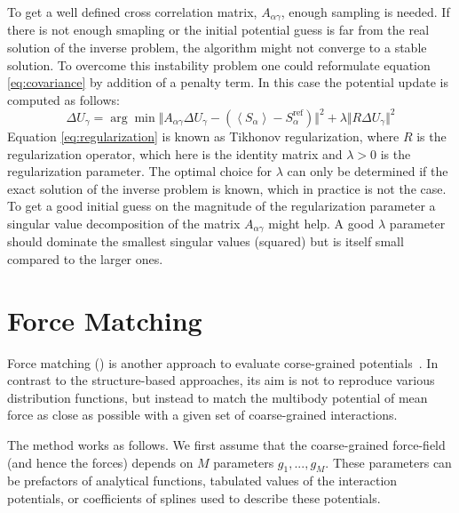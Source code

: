 To get a well defined cross correlation matrix, $A_{\alpha \gamma}$, enough sampling is needed. If there is not enough smapling or the initial potential guess is far from the real solution of the inverse problem, the algorithm might not converge to a stable solution. To overcome this instability problem one could reformulate equation \ref{eq:covariance} by addition of a penalty term. In this case the potential update is computed  as follows:\cite{Murtola:2007}
\begin{equation}
\label{eq:regularization}
\Delta U_\gamma = \arg \min \Vert A_{\alpha \gamma} \Delta U_\gamma - \left(\left<S_{\alpha}\right> - S_{\alpha}^{\text{ref}}\right) \Vert^2 + \lambda \Vert R \Delta U_{\gamma} \Vert ^{2}
\end{equation}
%
Equation \ref{eq:regularization} is known as Tikhonov regularization,
where $R$ is the regularization operator, which here is the identity matrix and $\lambda >0 $ is the regularization parameter.
The optimal choice for $\lambda$ can only be determined if the exact solution of the inverse problem is known, which in practice is not the case. To get a good initial guess on the magnitude of the regularization parameter a singular value decomposition of the matrix $A_{\alpha \gamma}$ might help. A good $\lambda$ parameter should dominate the smallest singular values (squared) but is itself small compared to the larger ones.\cite{Rosenberger:2016}
 
\section{Force Matching}
\label{sec:fm}



Force matching (\fm) is another approach to evaluate corse-grained potentials~\cite{Ercolessi:1994,Izvekov:2005,Noid:2007}. In contrast to the structure-based approaches, its aim is not to reproduce various distribution functions, but instead to match the multibody potential of mean force as close as possible with a given set of coarse-grained interactions.

The method works as follows. We first assume that the coarse-grained force-field (and hence the forces) depends on $M$ parameters $g_1,...,g_M $. These parameters can be prefactors of analytical functions, tabulated values of the interaction potentials, or coefficients of splines used to describe these potentials.

